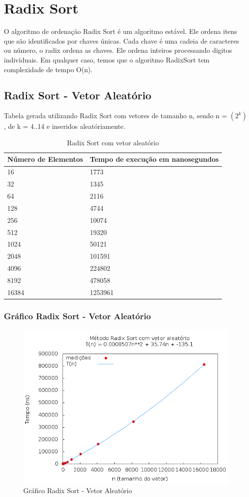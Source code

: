 \documentclass[12pt,a4paper,twoside]{report}
\begin{document}
\chapter{Radix Sort}
O algoritmo de ordenação Radix Sort é um algoritmo estável. Ele ordena itens que são identificados por chaves únicas. Cada chave é uma cadeia de caracteres ou número, o radix ordena as chaves. Ele ordena inteiros processando digitos indivíduais.
Em qualquer caso, temos que o algoritmo RadixSort tem complexidade de tempo O(n).

\section{Radix Sort - Vetor Aleatório}
Tabela gerada utilizando Radix Sort com vetores de tamanho n, sendo n = $(2^k)$, de k = 4..14 e inseridos aleatóriamente.
\begin{table}[H]
\centering
\caption{Radix Sort com vetor aleatório}
\label{my-label}
\begin{tabular}{|l|l|}
\hline
\multicolumn{1}{|c|}{\textbf{Número de Elementos}} & \multicolumn{1}{c|}{\textbf{Tempo de execução em nanosegundos}} \\ \hline
16 & 1773 \\ \hline
32 & 1345 \\ \hline
64 & 2116 \\ \hline
128 & 4744 \\ \hline
256 & 10074 \\ \hline
512 & 19320 \\ \hline
1024 & 50121 \\ \hline
2048 & 101591 \\ \hline
4096 & 224802 \\ \hline
8192 & 478058 \\ \hline
16384 & 1253961 \\ \hline
\end{tabular}
\end{table}

\subsection{Gráfico Radix Sort - Vetor Aleatório}
\begin{figure}[H]
    \centering
    \includegraphics[width=0.7\linewidth]{graficos/RadixSort/vIntAleatorio/vIntAleatorio.png}
  \caption{Gráfico Radix Sort - Vetor Aleatório}
\end{figure}
\end{document}
